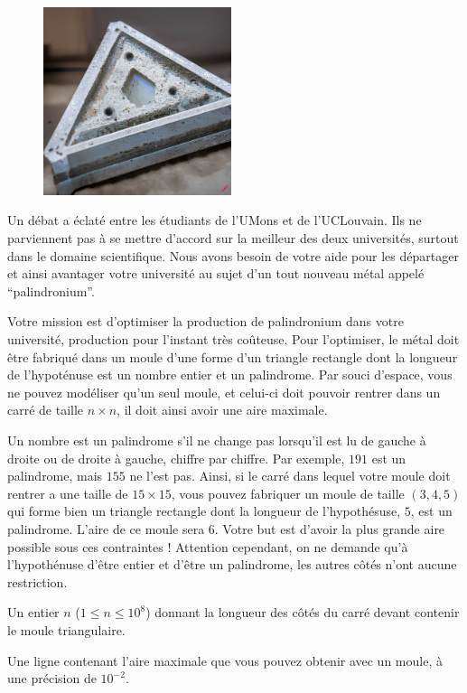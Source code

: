 \problemname{\problemyamlname}

\begin{figure}
    \centering
    \includegraphics[width=5.5cm]{palindromium.jpg}
\end{figure}
Un débat a éclaté entre les étudiants de l'UMons et de l'UCLouvain.
Ils ne parviennent pas à se mettre d'accord sur la meilleur des deux universités, surtout dans le domaine scientifique.
Nous avons besoin de votre aide pour les départager et ainsi avantager votre université au sujet d'un tout nouveau métal appelé ``palindronium''.

Votre mission est d'optimiser la production de palindronium dans votre université, production pour l'instant très coûteuse.
Pour l'optimiser, le métal doit être fabriqué dans un moule d'une forme d'un triangle rectangle dont la longueur de l'hypoténuse est un nombre entier et un palindrome.
Par souci d'espace, vous ne pouvez modéliser qu'un seul moule, et celui-ci doit pouvoir rentrer dans un carré de taille $n \times n$, il doit ainsi avoir une aire maximale.

Un nombre est un palindrome s'il ne change pas lorsqu'il est lu de gauche à droite ou de droite à gauche, chiffre par chiffre.
Par exemple, $191$ est un palindrome, mais $155$ ne l'est pas.
Ainsi, si le carré dans lequel votre moule doit rentrer a une taille de $15 \times 15$, vous pouvez fabriquer un moule de taille $(3,4,5)$ qui forme bien un triangle rectangle dont la longueur de l'hypothésuse, $5$, est un palindrome.
L'aire de ce moule sera $6$.
Votre but est d'avoir la plus grande aire possible sous ces contraintes ! Attention cependant, on ne demande qu'à l'hypothénuse d'être entier et d'être un palindrome, les autres côtés n'ont aucune restriction.

\begin{Input}
	Un entier $n$ ($1 \le n \le 10^8$) donnant la longueur des côtés du carré devant contenir le moule triangulaire.
\end{Input}

\begin{Output}
	Une ligne contenant l'aire maximale que vous pouvez obtenir avec un moule, à une précision de $10^{-2}$.
\end{Output}
